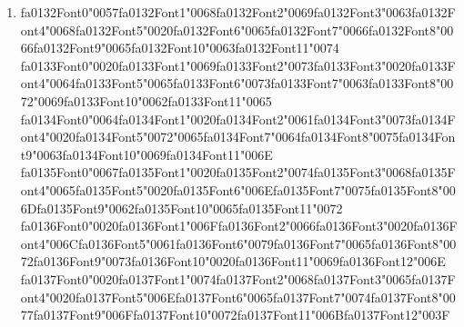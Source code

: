 \documentclass[12pt]{article}
\begin{document}
\begin{enumerate}[label=Q\arabic*.]
 \item {\csname fa0132Font0\endcsname\char"0057}{\csname fa0132Font1\endcsname\char"0068}{\csname fa0132Font2\endcsname\char"0069}{\csname fa0132Font3\endcsname\char"0063}{\csname fa0132Font4\endcsname\char"0068}{\csname fa0132Font5\endcsname\char"0020}{\csname fa0132Font6\endcsname\char"0065}{\csname fa0132Font7\endcsname\char"0066}{\csname fa0132Font8\endcsname\char"0066}{\csname fa0132Font9\endcsname\char"0065}{\csname fa0132Font10\endcsname\char"0063}{\csname fa0132Font11\endcsname\char"0074} {\csname fa0133Font0\endcsname\char"0020}{\csname fa0133Font1\endcsname\char"0069}{\csname fa0133Font2\endcsname\char"0073}{\csname fa0133Font3\endcsname\char"0020}{\csname fa0133Font4\endcsname\char"0064}{\csname fa0133Font5\endcsname\char"0065}{\csname fa0133Font6\endcsname\char"0073}{\csname fa0133Font7\endcsname\char"0063}{\csname fa0133Font8\endcsname\char"0072}{\char"0069}{\csname fa0133Font10\endcsname\char"0062}{\csname fa0133Font11\endcsname\char"0065} {\csname fa0134Font0\endcsname\char"0064}{\csname fa0134Font1\endcsname\char"0020}{\csname fa0134Font2\endcsname\char"0061}{\csname fa0134Font3\endcsname\char"0073}{\csname fa0134Font4\endcsname\char"0020}{\csname fa0134Font5\endcsname\char"0072}{\char"0065}{\csname fa0134Font7\endcsname\char"0064}{\csname fa0134Font8\endcsname\char"0075}{\csname fa0134Font9\endcsname\char"0063}{\csname fa0134Font10\endcsname\char"0069}{\csname fa0134Font11\endcsname\char"006E} {\csname fa0135Font0\endcsname\char"0067}{\csname fa0135Font1\endcsname\char"0020}{\csname fa0135Font2\endcsname\char"0074}{\csname fa0135Font3\endcsname\char"0068}{\csname fa0135Font4\endcsname\char"0065}{\csname fa0135Font5\endcsname\char"0020}{\csname fa0135Font6\endcsname\char"006E}{\csname fa0135Font7\endcsname\char"0075}{\csname fa0135Font8\endcsname\char"006D}{\csname fa0135Font9\endcsname\char"0062}{\csname fa0135Font10\endcsname\char"0065}{\csname fa0135Font11\endcsname\char"0072} {\csname fa0136Font0\endcsname\char"0020}{\csname fa0136Font1\endcsname\char"006F}{\csname fa0136Font2\endcsname\char"0066}{\csname fa0136Font3\endcsname\char"0020}{\csname fa0136Font4\endcsname\char"006C}{\csname fa0136Font5\endcsname\char"0061}{\csname fa0136Font6\endcsname\char"0079}{\csname fa0136Font7\endcsname\char"0065}{\csname fa0136Font8\endcsname\char"0072}{\csname fa0136Font9\endcsname\char"0073}{\csname fa0136Font10\endcsname\char"0020}{\csname fa0136Font11\endcsname\char"0069}{\csname fa0136Font12\endcsname\char"006E} {\csname fa0137Font0\endcsname\char"0020}{\csname fa0137Font1\endcsname\char"0074}{\csname fa0137Font2\endcsname\char"0068}{\csname fa0137Font3\endcsname\char"0065}{\csname fa0137Font4\endcsname\char"0020}{\csname fa0137Font5\endcsname\char"006E}{\csname fa0137Font6\endcsname\char"0065}{\csname fa0137Font7\endcsname\char"0074}{\csname fa0137Font8\endcsname\char"0077}{\csname fa0137Font9\endcsname\char"006F}{\csname fa0137Font10\endcsname\char"0072}{\csname fa0137Font11\endcsname\char"006B}{\csname fa0137Font12\endcsname\char"003F}

\end{enumerate}
\end{document}
